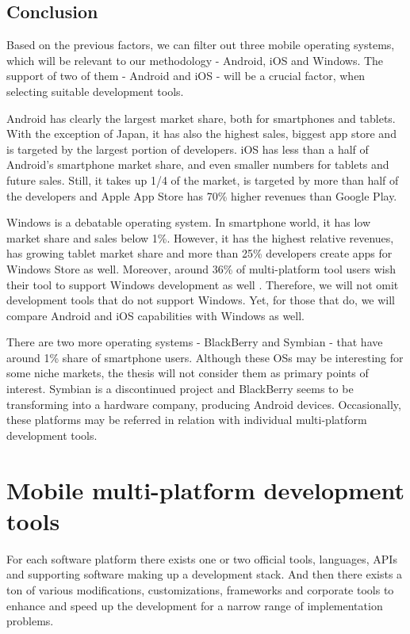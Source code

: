 \documentclass[english,master,public,dept460,male,cpdeclaration,oneside]{diploma}
\begin{document}
\subsection{Conclusion}
Based on the previous factors, we can filter out three mobile operating systems, which will be relevant to our methodology - Android, iOS and Windows. The support of two of them - Android and iOS - will be a crucial factor, when selecting suitable development tools. 

Android has clearly the largest market share, both for smartphones and tablets. With the exception of Japan, it has also the highest sales, biggest app store and is targeted by the largest portion of developers. iOS has less than a half of Android’s smartphone market share, and even smaller numbers for tablets and future sales. Still, it takes up 1/4 of the market, is targeted by more than half of the developers and Apple App Store has 70\% higher revenues than Google Play.

Windows is a debatable operating system. In smartphone world, it has low market share and sales below 1\%. However, it has the highest relative revenues, has growing tablet market share and more than 25\% developers create apps for Windows Store as well. Moreover, around 36\% of multi-platform tool users wish their tool to support Windows development as well \cite{cptBenchmarking2014}. Therefore, we will not omit development tools that do not support Windows. Yet, for those that do, we will compare Android and iOS capabilities with Windows as well.

There are two more operating systems - BlackBerry and Symbian - that have around 1\% share of smartphone users. Although these OSs may be interesting for some niche markets, the thesis will not consider them as primary points of interest. Symbian is a discontinued project and BlackBerry seems to be transforming into a hardware company, producing Android devices. Occasionally, these platforms may be referred in relation with individual multi-platform development tools.



\section{Mobile multi-platform development tools}
For each software platform there exists one or two official tools, languages, APIs and supporting software making up a development stack. And then there exists a ton of various modifications, customizations, frameworks and corporate tools to enhance and speed up the development for a narrow range of implementation problems.
\end{document}
